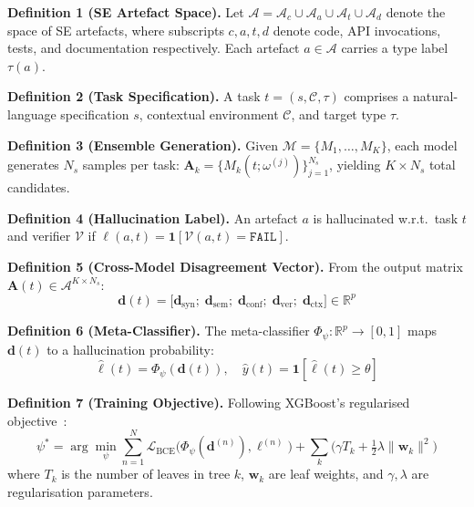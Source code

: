 \documentclass[11pt,a4paper]{article}
\begin{document}
\noindent\textbf{Definition 1 (SE Artefact Space).} Let $\mathcal{A} = \mathcal{A}_c \cup \mathcal{A}_a \cup \mathcal{A}_t \cup \mathcal{A}_d$ denote the space of SE artefacts, where subscripts $c, a, t, d$ denote code, API invocations, tests, and documentation respectively. Each artefact $a \in \mathcal{A}$ carries a type label $\tau(a)$.

\noindent\textbf{Definition 2 (Task Specification).} A task $t = (s, \mathcal{C}, \tau)$ comprises a natural-language specification $s$, contextual environment $\mathcal{C}$, and target type $\tau$.

\noindent\textbf{Definition 3 (Ensemble Generation).} Given $\mathcal{M} = \{M_1, \ldots, M_K\}$, each model generates $N_s$ samples per task: $\mathbf{A}_k = \{M_k(t; \omega^{(j)})\}_{j=1}^{N_s}$, yielding $K \times N_s$ total candidates.

\noindent\textbf{Definition 4 (Hallucination Label).} An artefact $a$ is hallucinated w.r.t.\ task $t$ and verifier $\mathcal{V}$ if $\ell(a,t) = \mathbf{1}[\mathcal{V}(a,t) = \texttt{FAIL}]$.

\noindent\textbf{Definition 5 (Cross-Model Disagreement Vector).} From the output matrix $\mathbf{A}(t) \in \mathcal{A}^{K \times N_s}$:
\begin{equation}
\mathbf{d}(t) = \bigl[\mathbf{d}_{\mathrm{syn}};\; \mathbf{d}_{\mathrm{sem}};\; \mathbf{d}_{\mathrm{conf}};\; \mathbf{d}_{\mathrm{ver}};\; \mathbf{d}_{\mathrm{ctx}}\bigr] \in \mathbb{R}^{p}
\label{eq:feature_vector}
\end{equation}

\noindent\textbf{Definition 6 (Meta-Classifier).} The meta-classifier $\Phi_\psi: \mathbb{R}^p \to [0,1]$ maps $\mathbf{d}(t)$ to a hallucination probability:
\begin{equation}
\hat{\ell}(t) = \Phi_\psi(\mathbf{d}(t)), \quad \hat{y}(t) = \mathbf{1}[\hat{\ell}(t) \geq \theta]
\end{equation}

\noindent\textbf{Definition 7 (Training Objective).} Following XGBoost's regularised objective~\cite{chen2016xgboost}:
\begin{equation}
\psi^* = \arg\min_\psi \sum_{n=1}^{N} \mathcal{L}_{\mathrm{BCE}}\!\bigl(\Phi_\psi(\mathbf{d}^{(n)}), \ell^{(n)}\bigr) + \sum_{k} \bigl(\gamma T_k + \tfrac{1}{2}\lambda\|\mathbf{w}_k\|^2\bigr)
\label{eq:objective}
\end{equation}
where $T_k$ is the number of leaves in tree $k$, $\mathbf{w}_k$ are leaf weights, and $\gamma, \lambda$ are regularisation parameters.
\end{document}
